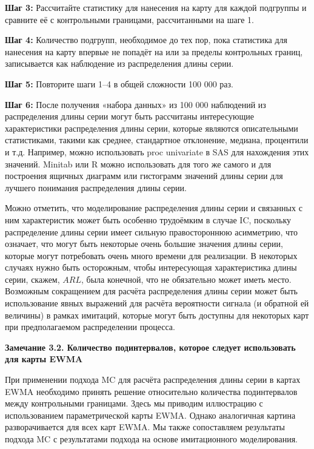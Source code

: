 \noindent\textbf{Шаг 3:} Рассчитайте статистику для нанесения на карту для каждой подгруппы и сравните её с контрольными границами, рассчитанными на шаге 1.

\noindent\textbf{Шаг 4:} Количество подгрупп, необходимое до тех пор, пока статистика для нанесения на карту впервые не попадёт на или за пределы контрольных границ, записывается как наблюдение из распределения длины серии.

\noindent\textbf{Шаг 5:} Повторите шаги 1–4 в общей сложности 100 000 раз.

\noindent\textbf{Шаг 6:} После получения «набора данных» из 100 000 наблюдений из распределения длины серии могут быть рассчитаны интересующие характеристики распределения длины серии, которые являются описательными статистиками, такими как среднее, стандартное отклонение, медиана, процентили и т.д. Например, можно использовать proc univariate в SAS для нахождения этих значений. Minitab или R можно использовать для того же самого и для построения ящичных диаграмм или гистограмм значений длины серии для лучшего понимания распределения длины серии.

Можно отметить, что моделирование распределения длины серии и связанных с ним характеристик может быть особенно трудоёмким в случае IC, поскольку распределение длины серии имеет сильную правостороннюю асимметрию, что означает, что могут быть некоторые очень большие значения длины серии, которые могут потребовать очень много времени для реализации. В некоторых случаях нужно быть осторожным, чтобы интересующая характеристика длины серии, скажем, \(ARL\), была конечной, что не обязательно может иметь место. Возможным сокращением для расчёта распределения длины серии может быть использование явных выражений для расчёта вероятности сигнала (и обратной ей величины) в рамках имитаций, которые могут быть доступны для некоторых карт при предполагаемом распределении процесса.

\noindent\textbf{Замечание 3.2. Количество подинтервалов, которое следует использовать для карты EWMA}

При применении подхода MC для расчёта распределения длины серии в картах EWMA необходимо принять решение относительно количества подинтервалов между контрольными границами. Здесь мы приводим иллюстрацию с использованием параметрической карты EWMA. Однако аналогичная картина разворачивается для всех карт EWMA. Мы также сопоставляем результаты подхода MC с результатами подхода на основе имитационного моделирования.

